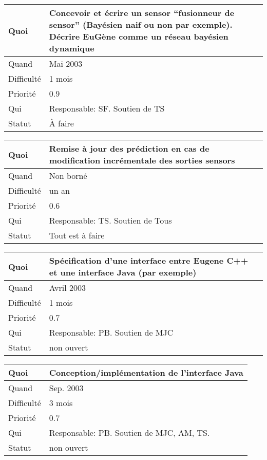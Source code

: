 \documentclass[a4paper,11pt]{article}
\begin{document}
\begin{longtable}{|l|p{7cm}|}\hline
  Quoi & Concevoir et \'ecrire un sensor ``fusionneur de sensor''
  (Bay\'esien naif ou non par exemple). D\'ecrire EuG\`ene comme un r\'eseau
  bay\'esien dynamique\\\hline
  Quand  &  Mai 2003\\\hline
  Difficult\'e & 1 mois \\\hline
  Priorit\'e &  0.9\\\hline
  Qui & Responsable: SF. Soutien de TS \\\hline
  Statut & \`A faire \\\hline
\end{longtable}
 
\begin{longtable}{|l|p{7cm}|}\hline
  Quoi & Remise \`a jour des pr\'ediction en cas de modification
  incr\'ementale des sorties sensors\\\hline
  Quand  &  Non born\'e\\\hline
  Difficult\'e &  un an \\\hline
  Priorit\'e &  0.6\\\hline
  Qui & Responsable: TS. Soutien de Tous\\\hline
  Statut & Tout est \`a faire\\\hline
\end{longtable}

\begin{longtable}{|l|p{7cm}|}\hline
  Quoi & Sp\'ecification d'une interface entre Eugene C++ et une interface
Java (par exemple)\\\hline
  Quand  &  Avril 2003\\\hline
  Difficult\'e & 1 mois \\\hline
  Priorit\'e &  0.7\\\hline
  Qui & Responsable: PB. Soutien de MJC\\\hline
  Statut & non ouvert\\\hline
\end{longtable}

\begin{longtable}{|l|p{7cm}|}\hline
  Quoi & Conception/impl\'ementation de l'interface Java\\\hline
  Quand  &  Sep. 2003\\\hline
  Difficult\'e & 3 mois \\\hline
  Priorit\'e &  0.7\\\hline
  Qui & Responsable: PB. Soutien de MJC, AM, TS.\\\hline
  Statut & non ouvert \\\hline
\end{longtable}
\end{document}
